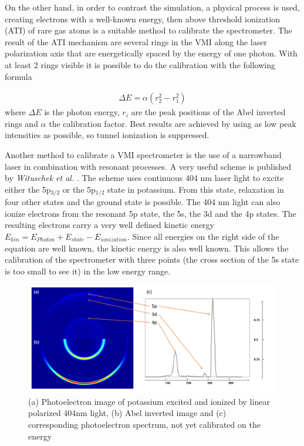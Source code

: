 On the other hand, in order to contrast the simulation, a physical process is used, creating electrons with a well-known energy, then above threshold ionization (ATI) of rare gas atoms is a suitable method to calibrate the spectrometer. The result of the ATI mechanism are several rings in the VMI along the laser polarization axis that are energetically spaced by the energy of one photon. With at least 2 rings visible it is possible to do the calibration with the following formula

\begin{align*}
\Delta E = \alpha (r_2^2-r_1^2)
\end{align*}
where $\Delta E$ is the photon energy, $r_i$ are the peak positions of the Abel inverted rings and $\alpha$ the calibration factor. Best results are achieved by using as low peak intensities as possible, so tunnel ionization is suppressed.


Another method to calibrate a VMI spectrometer is the use of a narrowband laser in combination with resonant processes. A very useful scheme is published by \textit{Wituschek et al.} \cite{wituschek_simple_2016}. The scheme uses continuous 404 nm laser light to excite either the 5p${}_{3/2}$ or the 5p${}_{1/2}$ state in potassium. From this state, relaxation in four other states and the ground state is possible. The 404 nm light can also ionize electrons from the resonant 5p state, the 5s, the 3d and the 4p states. The resulting electrons carry a very well defined kinetic energy $E_{kin}=E_{Photon}+E_{state}-E_{ionization}$. Since all energies on the right side of the equation are well known, the kinetic energy is also well known. This allows the calibration of the spectrometer with three points (the cross section of the 5s state is too small to see it) in the low energy range.

\begin{figure}
\centering
\includegraphics[scale=0.5]{../images/potassium_calib.png}
\caption{(a) Photoelectron image of potassium excited and ionized by linear polarized 404nm light, (b) Abel inverted image and (c) corresponding photoelectron spectrum, not yet calibrated on the energy}
\end{figure}



